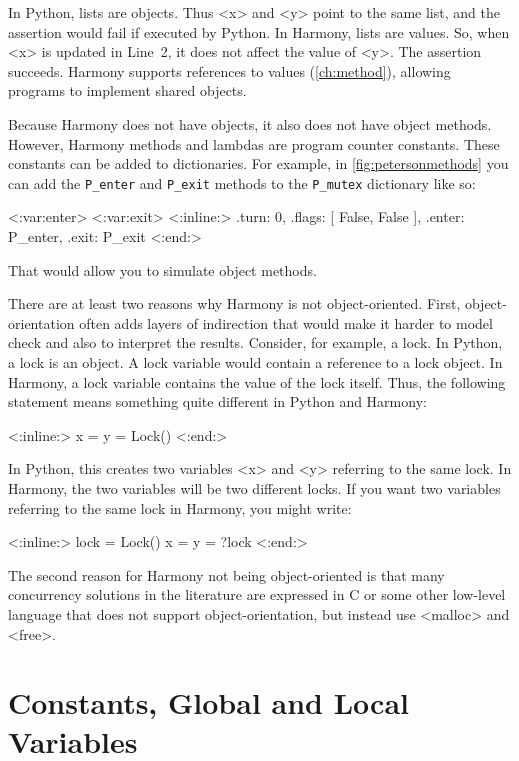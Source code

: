 \documentclass{report}
\newenvironment{code}{
\tcolorbox
}{
\endtcolorbox
}
\begin{document}
In Python, lists are objects.  Thus <{x}> and <{y}> point to the same list,
and the assertion would fail if executed by Python.
In Harmony, lists are values.  So, when <{x}> is updated in Line~2, it does
not affect the value of <{y}>.  The assertion succeeds.
Harmony supports references to values (\autoref{ch:method}),
allowing programs to implement shared objects.

Because Harmony does not have objects, it also does not have object methods.
However, Harmony methods and lambdas are program counter constants.
These constants can be added to dictionaries.
For example, in \autoref{fig:petersonmethods}
you can add the \texttt{P\_enter} and
\texttt{P\_exit} methods to the \texttt{P\_mutex} dictionary
like so:
\begin{code}
<{:var:enter}>
<{:var:exit}>
<{:inline:}>
{ .turn: 0, .flags: [ False, False ], .enter: P_enter, .exit: P_exit }
<{:end:}>
\end{code}
That would allow you to simulate object methods.

There are at least two reasons why Harmony is not object-oriented.
First,
object-orientation often adds layers of indirection that would make it
harder to model check and also to interpret the results.  Consider, for example,
a lock.  In Python, a lock is an object.  A lock variable would contain a
reference to a lock object.  In Harmony, a lock variable contains the value
of the lock itself.
Thus, the following statement means something quite different in Python and
Harmony:

\begin{code}
<{:inline:}>
x = y = Lock()
<{:end:}>
\end{code}

In Python, this creates two variables <{x}> and <{y}> referring to the same lock.
In Harmony, the two variables will be two different locks.  If you want two
variables referring to the same lock in Harmony, you might write:

\begin{code}
<{:inline:}>
lock = Lock()
x = y = ?lock
<{:end:}>
\end{code}

The second reason for Harmony not being object-oriented is that
many concurrency solutions in the literature are
expressed in C or some other low-level language that does not support
object-orientation, but instead use <{malloc}> and <{free}>.

\section{Constants, Global and Local Variables}\label{sec:vars}
\end{document}
